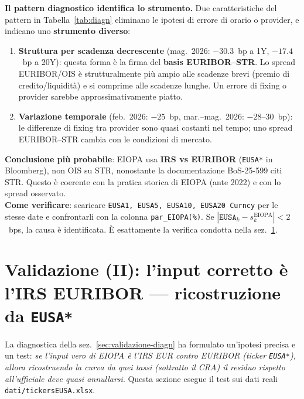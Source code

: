 \documentclass[11pt,a4paper]{article}
\theoremstyle{plain}
\theoremstyle{definition}
\theoremstyle{remark}
\begin{document}
\begin{warningbox}
\textbf{Il pattern diagnostico identifica lo strumento.}
Due caratteristiche del pattern in Tabella~\ref{tab:diagn} eliminano le ipotesi di
errore di orario o provider, e indicano uno \textbf{strumento diverso}:
\begin{enumerate}
  \item \textbf{Struttura per scadenza decrescente} (mag.~2026: $-30.3$~bp a 1Y,
        $-17.4$~bp a 20Y): questa forma \`e la firma del \textbf{basis
        EURIBOR--\texteuro{}STR}. Lo spread EURIBOR/OIS \`e strutturalmente pi\`u ampio
        alle scadenze brevi (premio di credito/liquidit\`a) e si comprime alle scadenze
        lunghe. Un errore di fixing o provider sarebbe approssimativamente piatto.
  \item \textbf{Variazione temporale} (feb.~2026: $-25$~bp, mar.--mag.~2026: $-28$--$30$~bp):
        le differenze di fixing tra provider sono quasi costanti nel tempo; uno spread
        EURIBOR--\texteuro{}STR cambia con le condizioni di mercato.
\end{enumerate}
\textbf{Conclusione pi\`u probabile}: EIOPA usa \textbf{IRS vs EURIBOR} (\texttt{EUSA*} in
Bloomberg), non OIS su \texteuro{}STR, nonostante la documentazione BoS-25-599 citi
\texteuro{}STR. Questo \`e coerente con la pratica storica di EIOPA (ante 2022) e con lo
spread osservato.\\[2pt]
\textbf{Come verificare}: scaricare \texttt{EUSA1, EUSA5, EUSA10, EUSA20 Curncy} per le
stesse date e confrontarli con la colonna \texttt{par\_EIOPA(\%)}. Se
$|\texttt{EUSA}_k - s_k^{\text{EIOPA}}| < 2$~bps, la causa \`e identificata. \`E
esattamente la verifica condotta nella sez.~\ref{sec:validazione-eusa}.
\end{warningbox}

\section{Validazione (II): l'input corretto \`e l'IRS EURIBOR --- ricostruzione da \texttt{EUSA*}}
\label{sec:validazione-eusa}

La diagnostica della sez.~\ref{sec:validazione-diagn} ha formulato un'ipotesi precisa e
un test: \emph{se l'input vero di EIOPA \`e l'IRS EUR contro EURIBOR (ticker \texttt{EUSA*}),
allora ricostruendo la curva da quei tassi (sottratto il CRA) il residuo rispetto
all'ufficiale deve quasi annullarsi}. Questa sezione esegue il test sui dati reali
\texttt{dati/tickersEUSA.xlsx}.
\end{document}
